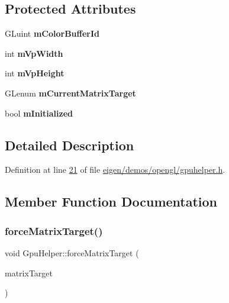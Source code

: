 \subsection*{Protected Attributes}
\begin{DoxyCompactItemize}
\item 
\mbox{\label{class_gpu_helper_a19e1ce1cf9b1aad5dce403311b4dd5ef}} 
G\+Luint {\bfseries m\+Color\+Buffer\+Id}
\item 
\mbox{\label{class_gpu_helper_a40fca0b9c8e2cdd342aa0df03e70f2ff}} 
int {\bfseries m\+Vp\+Width}
\item 
\mbox{\label{class_gpu_helper_a22f08b8a5d8e9ae28390daf782b85efd}} 
int {\bfseries m\+Vp\+Height}
\item 
\mbox{\label{class_gpu_helper_ae16cf957b92ae1a6abcd9b942bc19f02}} 
G\+Lenum {\bfseries m\+Current\+Matrix\+Target}
\item 
\mbox{\label{class_gpu_helper_a6f6e810a25519a32476fbbd25c9b4afa}} 
bool {\bfseries m\+Initialized}
\end{DoxyCompactItemize}


\subsection{Detailed Description}


Definition at line \hyperlink{eigen_2demos_2opengl_2gpuhelper_8h_source_l00021}{21} of file \hyperlink{eigen_2demos_2opengl_2gpuhelper_8h_source}{eigen/demos/opengl/gpuhelper.\+h}.



\subsection{Member Function Documentation}
\mbox{\label{class_gpu_helper_a52a9ab12d07acbf4ad80737595a9b06e}} 
\subsubsection{\texorpdfstring{force\+Matrix\+Target()}{forceMatrixTarget()}\hspace{0.1cm}{\footnotesize\ttfamily [1/2]}}
{\footnotesize\ttfamily void Gpu\+Helper\+::force\+Matrix\+Target (\begin{DoxyParamCaption}\item[{G\+Lenum}]{matrix\+Target }\end{DoxyParamCaption})\hspace{0.3cm}{\ttfamily [inline]}}

